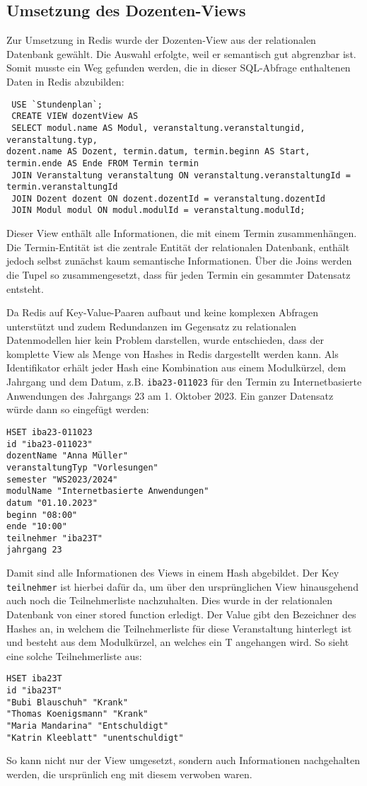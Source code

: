 \subsection{Umsetzung des Dozenten-Views}
Zur Umsetzung in Redis wurde der Dozenten-View aus der relationalen Datenbank gewählt. Die Auswahl erfolgte, weil er semantisch gut abgrenzbar ist.\\
Somit musste ein Weg gefunden werden, die in dieser SQL-Abfrage enthaltenen Daten in Redis abzubilden:
\begin{lstlisting}
 USE `Stundenplan`;
 CREATE VIEW dozentView AS
 SELECT modul.name AS Modul, veranstaltung.veranstaltungid, veranstaltung.typ,
dozent.name AS Dozent, termin.datum, termin.beginn AS Start, termin.ende AS Ende FROM Termin termin
 JOIN Veranstaltung veranstaltung ON veranstaltung.veranstaltungId = termin.veranstaltungId
 JOIN Dozent dozent ON dozent.dozentId = veranstaltung.dozentId
 JOIN Modul modul ON modul.modulId = veranstaltung.modulId;
\end{lstlisting}
Dieser View enthält alle Informationen, die mit einem Termin zusammenhängen. Die Termin-Entität ist die zentrale Entität der relationalen Datenbank, enthält jedoch selbst zunächst kaum semantische Informationen. Über die Joins werden die Tupel so zusammengesetzt, dass für jeden Termin ein gesammter Datensatz entsteht.

\vspace{6pt}

Da Redis auf Key-Value-Paaren aufbaut und keine komplexen Abfragen unterstützt und zudem Redundanzen im Gegensatz zu relationalen Datenmodellen hier kein Problem darstellen, wurde entschieden, dass der komplette View als Menge von Hashes in Redis dargestellt werden kann. Als Identifikator erhält jeder Hash eine Kombination aus einem Modulkürzel, dem Jahrgang und dem Datum, z.B. \texttt{iba23-011023} für den Termin zu Internetbasierte Anwendungen des Jahrgangs 23 am 1. Oktober 2023.
Ein ganzer Datensatz würde dann so eingefügt werden:
\begin{lstlisting}
HSET iba23-011023 
id "iba23-011023" 
dozentName "Anna Müller" 
veranstaltungTyp "Vorlesungen" 
semester "WS2023/2024" 
modulName "Internetbasierte Anwendungen" 
datum "01.10.2023" 
beginn "08:00" 
ende "10:00" 
teilnehmer "iba23T" 
jahrgang 23
\end{lstlisting}
Damit sind alle Informationen des Views in einem Hash abgebildet. Der Key \texttt{teilnehmer} ist hierbei dafür da, um über den ursprünglichen View hinausgehend auch noch die Teilnehmerliste nachzuhalten. Dies wurde in der relationalen Datenbank von einer stored function erledigt. Der Value gibt den Bezeichner des Hashes an, in welchem die Teilnehmerliste für diese Veranstaltung hinterlegt ist und besteht aus dem Modulkürzel, an welches ein T angehangen wird. So sieht eine solche Teilnehmerliste aus:
\begin{lstlisting}
HSET iba23T 
id "iba23T" 
"Bubi Blauschuh" "Krank" 
"Thomas Koenigsmann" "Krank" 
"Maria Mandarina" "Entschuldigt" 
"Katrin Kleeblatt" "unentschuldigt"
\end{lstlisting}
So kann nicht nur der View umgesetzt, sondern auch Informationen nachgehalten werden, die ursprünlich eng mit diesem verwoben waren.

